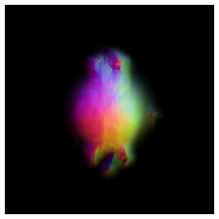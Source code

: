 \begin{figure}[H]
    \centering
    \begin{subfigure}[b]{0.20\textwidth}
        \centering
        \fontsize{9pt}{7pt}\selectfont{}\vspace{3cm}
        \fontsize{9pt}{7pt}\selectfont{}\vspace{2.85cm}
        \fontsize{9pt}{7pt}\selectfont{}\vspace{1.95cm}
    \end{subfigure}
    \begin{subfigure}[b]{0.20\textwidth}
        \centering
        \includegraphics[width=\textwidth]{etc/a robot made out of plants/dreamfusion/dreamfusion_plantrobot_1_part2.png}

\end{subfigure}
\end{figure}
